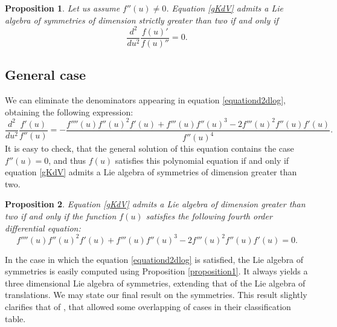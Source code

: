 \documentclass[
11pt,%
tightenlines,%
twoside,%
onecolumn,%
nofloats,%
nobibnotes,%
nofootinbib,%
superscriptaddress,%
noshowpacs,%
centertags]%
{revtex4}
\newtheorem{proposition}{Proposition}
\begin{document}
\begin{proposition}
Let us assume $f''(u) \neq 0$. Equation \eqref{gKdV} admits a Lie algebra of symmetries of dimension strictly greater than two if and only if
$$\frac{d^2}{du^2}\frac{f(u)'}{f(u)''} = 0.$$
\end{proposition}

\subsection{General case}

We can eliminate the denominators appearing in equation \eqref{equationd2dlog}, obtaining the following expression:
\begin{equation}
\frac{d^2}{du^2}\frac{f'(u)}{f''(u)} = 
- \frac{f''''(u)f''(u)^2f'(u) + f'''(u)f''(u)^3 
- 2f'''(u)^2f''(u)f'(u)}{f''(u)^4}.
\end{equation}
It is easy to check, that the general solution of this equation contains the case $f''(u) = 0$, and thus $f(u)$ satisfies this polynomial equation if and only if equation \eqref{gKdV} admits a Lie algebra of symmetries of dimension greater than two. 

\begin{proposition}
Equation \eqref{gKdV} admits a Lie algebra of dimension greater than two if and only if the function $f(u)$
satisfies the following fourth order differential equation: 
\begin{equation}\label{equationNyS}
f''''(u)f''(u)^2f'(u) + f'''(u)f''(u)^3 
- 2f'''(u)^2f''(u)f'(u) = 0.
\end{equation}
\end{proposition}

In the case in which the equation \eqref{equationd2dlog} is satisfied, the Lie algebra of symmetries is easily computed using Proposition \ref{proposition1}. It always yields a three dimensional Lie algebra of symmetries, extending that of the Lie algebra of translations. We may state our final result on the symmetries. This result slightly clarifies that of \cite{Motlatsi2014}, that allowed some overlapping of cases in their classification table. 
\end{document}
